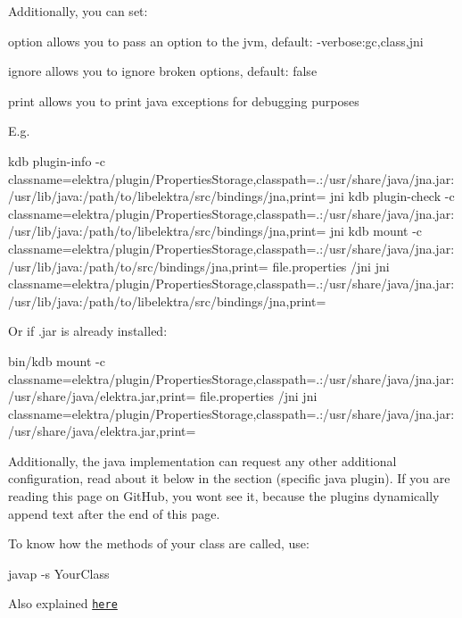 Additionally, you can set\+:


\begin{DoxyItemize}
\item option allows you to pass an option to the jvm, default\+: {\ttfamily -\/verbose\+:gc,class,jni}
\item ignore allows you to ignore broken options, default\+: {\ttfamily false}
\item print allows you to print java exceptions for debugging purposes
\end{DoxyItemize}

E.\+g.


\begin{DoxyCode}
kdb plugin-info -c
       classname=elektra/plugin/PropertiesStorage,classpath=.:/usr/share/java/jna.jar:/usr/lib/java:/path/to/libelektra/src/bindings/jna,print= jni
kdb plugin-check -c
       classname=elektra/plugin/PropertiesStorage,classpath=.:/usr/share/java/jna.jar:/usr/lib/java:/path/to/libelektra/src/bindings/jna,print= jni
kdb mount -c
       classname=elektra/plugin/PropertiesStorage,classpath=.:/usr/share/java/jna.jar:/usr/lib/java:/path/to/src/bindings/jna,print= file.properties /jni jni
       classname=elektra/plugin/PropertiesStorage,classpath=.:/usr/share/java/jna.jar:/usr/lib/java:/path/to/libelektra/src/bindings/jna,print=
\end{DoxyCode}


Or if {\ttfamily .jar} is already installed\+:


\begin{DoxyCode}
bin/kdb mount -c
       classname=elektra/plugin/PropertiesStorage,classpath=.:/usr/share/java/jna.jar:/usr/share/java/elektra.jar,print= file.properties /jni jni
       classname=elektra/plugin/PropertiesStorage,classpath=.:/usr/share/java/jna.jar:/usr/share/java/elektra.jar,print=
\end{DoxyCode}


Additionally, the java implementation can request any other additional configuration, read about it below in the section (specific java plugin). If you are reading this page on Git\+Hub, you won\textquotesingle{}t see it, because the plugins dynamically append text after the end of this page.

To know how the methods of your class are called, use\+:


\begin{DoxyCode}
javap -s YourClass
\end{DoxyCode}


Also explained \href{https://docs.oracle.com/javase/7/docs/technotes/guides/jni/spec/types.html#wp15773}{\tt here}

